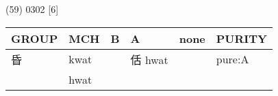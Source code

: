 \documentclass[14pt,a4paper]{scrartcl}
\begin{document}
(59) 0302 {[}6{]}

\begin{longtable}[c]{@{}llllll@{}}
\toprule
\begin{minipage}[b]{0.14\columnwidth}\raggedright\strut
GROUP
\strut\end{minipage} &
\begin{minipage}[b]{0.14\columnwidth}\raggedright\strut
MCH
\strut\end{minipage} &
\begin{minipage}[b]{0.14\columnwidth}\raggedright\strut
B
\strut\end{minipage} &
\begin{minipage}[b]{0.14\columnwidth}\raggedright\strut
A
\strut\end{minipage} &
\begin{minipage}[b]{0.14\columnwidth}\raggedright\strut
none
\strut\end{minipage} &
\begin{minipage}[b]{0.14\columnwidth}\raggedright\strut
PURITY
\strut\end{minipage}\tabularnewline
\midrule
\endhead
\begin{minipage}[t]{0.14\columnwidth}\raggedright\strut
昏
\strut\end{minipage} &
\begin{minipage}[t]{0.14\columnwidth}\raggedright\strut
kwat
\strut\end{minipage} &
\begin{minipage}[t]{0.14\columnwidth}\raggedright\strut
\strut\end{minipage} &
\begin{minipage}[t]{0.14\columnwidth}\raggedright\strut
佸 hwat
\strut\end{minipage} &
\begin{minipage}[t]{0.14\columnwidth}\raggedright\strut
\strut\end{minipage} &
\begin{minipage}[t]{0.14\columnwidth}\raggedright\strut
pure:A
\strut\end{minipage}\tabularnewline
\begin{minipage}[t]{0.14\columnwidth}\raggedright\strut
𠯑
\strut\end{minipage} &
\begin{minipage}[t]{0.14\columnwidth}\raggedright\strut
hwat
\strut\end{minipage} &
\begin{minipage}[t]{0.14\columnwidth}\raggedright\strut
\strut\end{minipage} &

\end{longtable}
\end{document}
